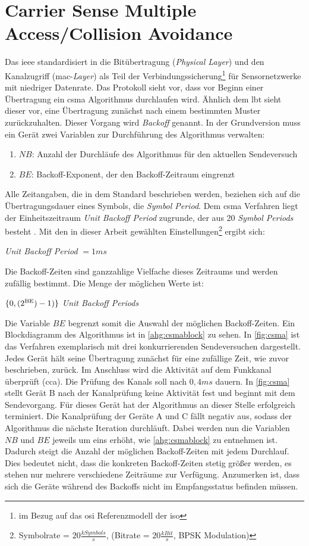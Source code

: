 \section{Carrier Sense Multiple Access/Collision Avoidance}
Das \ac{ieee} standardisiert in \cite{ieee} die Bitübertragung (\emph{Physical Layer}) und den Kanalzugriff (\acs{mac}-\emph{Layer}) als Teil der Verbindungssicherung\footnote{im Bezug auf das \acl{osi} Referenzmodell der \acs{iso}} für Sensornetzwerke mit niedriger Datenrate. Das Protokoll sieht vor, dass vor Beginn einer Übertragung ein \acl{csma} Algorithmus durchlaufen wird. Ähnlich dem \acs{lbt} sieht dieser vor, eine Übertragung zunächst nach einem bestimmten Muster zurückzuhalten. Dieser Vorgang wird \emph{Backoff} genannt. In der Grundversion muss ein Gerät zwei Variablen zur Durchführung des Algorithmus verwalten:
\begin{enumerate}
	\item $NB$: Anzahl der Durchläufe des Algorithmus für den aktuellen Sendeversuch
	\item $BE$: Backoff-Exponent, der den Backoff-Zeitraum eingrenzt
\end{enumerate}
Alle Zeitangaben, die in dem Standard beschrieben werden, beziehen sich auf die Übertragungsdauer eines Symbols, die \emph{Symbol Period}. Dem \acs{csma} Verfahren liegt der Einheitszeitraum \emph{Unit Backoff Period} zugrunde, der aus 20 \emph{Symbol Periods} besteht \cite{ieee}. Mit den in dieser Arbeit gewählten Einstellungen\footnote{Symbolrate = $20 \frac{kSymbols}{s}$, (Bitrate = $20 \frac{kBit}{s}$, BPSK Modulation)} ergibt sich:
\begin{center}
\emph{Unit Backoff Period} $ = 1ms$
\end{center}
Die Backoff-Zeiten sind ganzzahlige Vielfache dieses Zeitraums und  werden zufällig bestimmt. Die Menge der möglichen Werte ist: 
\begin{center}
$\{0, (2\textsuperscript{BE})-1)\}$  \emph{Unit Backoff Periods}
\end{center}
Die Variable $BE$ begrenzt somit die Auswahl der möglichen Backoff-Zeiten. Ein Blockdiagramm des Algorithmus ist in \autoref{ahg:csmablock} zu sehen. In \autoref{fig:csma} ist das Verfahren exemplarisch mit drei konkurrierenden Sendeversuchen dargestellt. Jedes Gerät hält seine Übertragung zunächst für eine zufällige Zeit, wie zuvor beschrieben, zurück. Im Anschluss wird die Aktivität auf dem Funkkanal überprüft (\acf{cca}). Die Prüfung des Kanals soll nach \citep{ieee} $0,4ms$ dauern. In \autoref{fig:csma} stellt Gerät B nach der Kanalprüfung keine Aktivität fest und beginnt mit dem Sendevorgang. Für dieses Gerät hat der Algorithmus an dieser Stelle erfolgreich terminiert. Die Kanalprüfung der Geräte A und C fällt negativ aus, sodass der Algorithmus die nächste Iteration durchläuft. Dabei werden nun die Variablen $NB$ und $BE$ jeweils um eins erhöht, wie \autoref{ahg:csmablock} zu entnehmen ist. Dadurch steigt die Anzahl der möglichen Backoff-Zeiten mit jedem Durchlauf. Dies bedeutet nicht, dass die konkreten Backoff-Zeiten stetig größer werden, es stehen nur mehrere verschiedene Zeiträume zur Verfügung.
Anzumerken ist, dass sich die Geräte während des Backoffs nicht im Empfangsstatus befinden müssen. 

